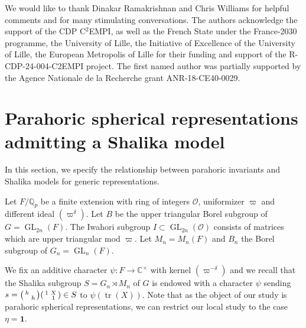 \documentclass{amsart}
\theoremstyle{definition}
\newcommand{\tr}{\operatorname{tr}}
\newcommand{\GL}{\operatorname{GL}}
\newenvironment{spmatrix}{\left(\begin{smallmatrix}}{\end{smallmatrix}\right)}
\begin{document}
{  { \small
We would like to thank  Dinakar Ramakrishnan and  Chris Williams for helpful comments and for many stimulating conversations. 
The authors acknowledge the support of the CDP C${}^2$EMPI, as well as the French State under the France-2030 programme, the University of Lille, the Initiative of Excellence of the University of Lille, the European Metropolis of Lille for their funding and support of the R-CDP-24-004-C2EMPI project.
The first named author was partially supported by  the Agence Nationale de la Recherche grant ANR-18-CE40-0029. 
} 

\tableofcontents



\section{Parahoric spherical representations admitting a Shalika model}\label{s1}
In this section, we specify the relationship between parahoric invariants and Shalika models for generic representations. 


Let $F/\mathbb{Q}_p$ be a finite extension with ring of integers $\mathcal{O}$,  uniformizer $\varpi$ and  different ideal $(\varpi^{\delta})$. 
Let $B$ be the upper triangular Borel subgroup of  $G=\GL_{2n}(F)$. The Iwahori subgroup $I\subset
\GL_{2n}(\mathcal{O})$ consists of matrices which are upper triangular mod $\varpi$.
Let $M_n=M_n(F)$ and  $B_n$ the Borel subgroup of $G_n=\GL_n(F)$.  

We fix an additive character $\psi:F\to \mathbb{C}^\times$ with kernel $(\varpi^{-\delta})$ and we recall that the Shalika subgroup 
$S=G_n\rtimes M_n$ of $G$ is  endowed with a character $\psi$ sending $s=\begin{spmatrix} h&\\&h\end{spmatrix}\begin{spmatrix} 1&X\\&1\end{spmatrix}\in S$ to $\psi(\tr(X))$. Note that as the object of our study is parahoric spherical representations, we can restrict our local study to the case $\eta=\mathbf{1}$. 

}
\end{document}
